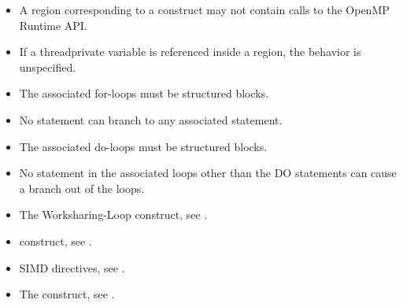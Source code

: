 \begin{itemize}

\item A  region corresponding to a  construct may not
  contain calls to the OpenMP Runtime API.

\item If a threadprivate variable is referenced inside a  region, the behavior is unspecified.

\end{itemize}

\begin{ccppspecific}
\begin{itemize}

  \item The associated for-loops must be structured blocks.

  \item No statement can branch to any associated  statement.

\end{itemize}

\end{ccppspecific}

\begin{fortranspecific}
\begin{itemize}

  \item The associated do-loops must be structured blocks.

  \item No statement in the associated loops other than the DO statements can cause
    a branch out of the loops.


\end{itemize}
\end{fortranspecific}

\crossreferences
\begin{itemize}
  \item The Worksharing-Loop construct, see .

  \item {} construct, see .

  \item SIMD directives, see .

  \item The  construct, see .

\end{itemize}



